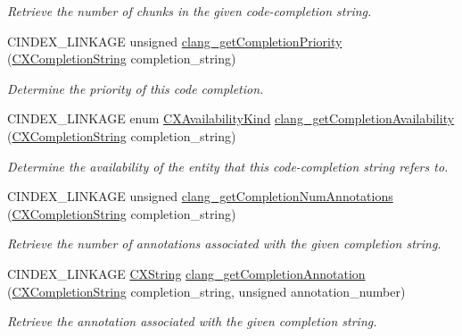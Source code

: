 \begin{DoxyCompactItemize}
\begin{DoxyCompactList}\small\item\em Retrieve the number of chunks in the given code-\/completion string. \end{DoxyCompactList}\item 
C\+I\+N\+D\+E\+X\+\_\+\+L\+I\+N\+K\+A\+GE unsigned \hyperlink{group__CINDEX__CODE__COMPLET_ga46e843acdf63d9a7a0c7341a2d222c49}{clang\+\_\+get\+Completion\+Priority} (\hyperlink{group__CINDEX__CODE__COMPLET_gafea23a43a60ec3b4f3bedccfbb76883a}{C\+X\+Completion\+String} completion\+\_\+string)
\begin{DoxyCompactList}\small\item\em Determine the priority of this code completion. \end{DoxyCompactList}\item 
C\+I\+N\+D\+E\+X\+\_\+\+L\+I\+N\+K\+A\+GE enum \hyperlink{group__CINDEX_gada331ea0195e952c8f181ecf15e83d71}{C\+X\+Availability\+Kind} \hyperlink{group__CINDEX__CODE__COMPLET_gacbbded5dd9c27b927ed5080d8b530845}{clang\+\_\+get\+Completion\+Availability} (\hyperlink{group__CINDEX__CODE__COMPLET_gafea23a43a60ec3b4f3bedccfbb76883a}{C\+X\+Completion\+String} completion\+\_\+string)
\begin{DoxyCompactList}\small\item\em Determine the availability of the entity that this code-\/completion string refers to. \end{DoxyCompactList}\item 
C\+I\+N\+D\+E\+X\+\_\+\+L\+I\+N\+K\+A\+GE unsigned \hyperlink{group__CINDEX__CODE__COMPLET_gadce9960ed8d554f497eda0457a3d52f9}{clang\+\_\+get\+Completion\+Num\+Annotations} (\hyperlink{group__CINDEX__CODE__COMPLET_gafea23a43a60ec3b4f3bedccfbb76883a}{C\+X\+Completion\+String} completion\+\_\+string)
\begin{DoxyCompactList}\small\item\em Retrieve the number of annotations associated with the given completion string. \end{DoxyCompactList}\item 
C\+I\+N\+D\+E\+X\+\_\+\+L\+I\+N\+K\+A\+GE \hyperlink{structCXString}{C\+X\+String} \hyperlink{group__CINDEX__CODE__COMPLET_ga5a6995822b664926ac3d919d69e736ce}{clang\+\_\+get\+Completion\+Annotation} (\hyperlink{group__CINDEX__CODE__COMPLET_gafea23a43a60ec3b4f3bedccfbb76883a}{C\+X\+Completion\+String} completion\+\_\+string, unsigned annotation\+\_\+number)
\begin{DoxyCompactList}\small\item\em Retrieve the annotation associated with the given completion string. \end{DoxyCompactList}\item 

\end{DoxyCompactItemize}
